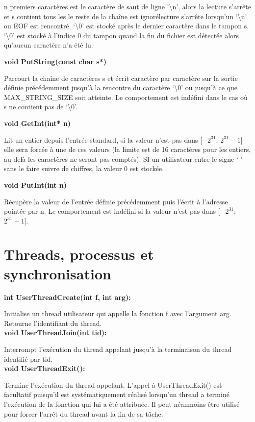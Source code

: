 \documentclass[12pt]{report}
\begin{document}
 n premiers caractères est le caractère de saut de ligne '\textbackslash n', alors la lecture s'arrête et s contient tous les le reste de la chaîne est ignorélecture s’arrête lorsqu’un ‘\textbackslash n’ ou EOF est rencontré.
‘\textbackslash 0’ est stocké après le dernier caractère dans le tampon s.
‘\textbackslash 0’ est stocké à l’indice 0 du tampon quand la fin du fichier est détectée alors qu’aucun caractère n’a été lu.

\textbf{void PutString(const char s*)}

Parcourt la chaîne de caractères s et écrit caractère par caractère sur la sortie définie précédemment jusqu’à la rencontre du caractère ‘\textbackslash 0’ ou jusqu’à ce que MAX\_STRING\_SIZE soit atteinte. Le comportement est indéfini dans le cas où s ne contient pas de ‘\textbackslash 0’.

\textbf{void GetInt(int* n)}

Lit un entier depuis l'entrée standard, si la valeur n'est pas dans [$-2^{31}$; $2^{31}-1$] elle sera forcée à une de ces valeurs (la limite est de 16 caractères pour les entiers, au-delà les caractères ne seront pas comptés). SI un utilisateur entre le signe ‘-’ sans le faire suivre de chiffres, la valeur 0 est stockée.

\textbf{void PutInt(int n)}

Récupère la valeur de l’entrée définie précédemment puis l’écrit à l’adresse pointée par n. Le comportement est indéfini si la valeur n'est pas dans [$-2^{31}$; $2^{31}-1$].



\section{Threads, processus et synchronisation}

\textbf{int UserThreadCreate(int f, int arg):}

Initialise un thread utilisateur qui appelle la fonction f avec l'argument arg.
Retourne l’identifiant du thread.\\


\textbf{void UserThreadJoin(int tid):}

Interrompt l'exécution du thread appelant jusqu'à la terminaison du thread identifié par tid.\\


\textbf{void UserThreadExit():}

Termine l'exécution du thread appelant. L'appel à UserThreadExit() est facultatif puisqu'il est systématiquement réalisé lorsqu'un thread a terminé l'exécution de la fonction qui lui a été attribuée. Il peut néanmoins être utilisé pour forcer l'arrêt du thread avant la fin de sa tâche.\\
\end{document}
